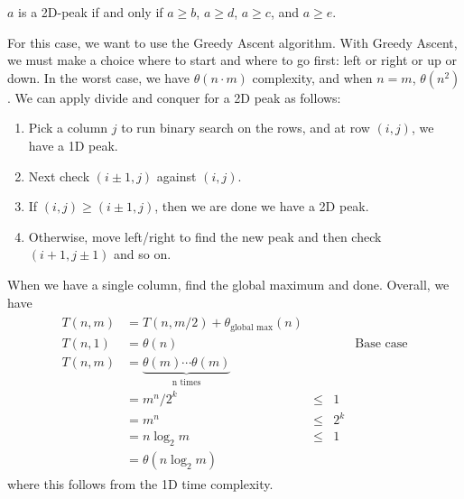 \begin{definition}
	\(a\) is a 2D-peak if and only if \(a\geq b\), \(a\geq d\), \(a\geq c\), and \(a\geq e\).
\end{definition}
\noindent
For this case, we want to use the Greedy Ascent algorithm. With Greedy Ascent, we must make a
choice where to start and where to go first: left or right or up or down. In the worst case, we have
\(\theta(n\cdot m)\) complexity, and when \(n = m\), \(\theta(n^2)\). We can apply divide and conquer
for a 2D peak as follows:
\begin{enumerate}
	\item Pick a column \(j\) to run binary search on the rows, and at row \((i, j)\), we have a 1D peak.
	\item Next check \((i \pm 1, j)\) against \((i, j)\).
	\item If \((i , j)\geq (i \pm 1, j)\), then we are done we have a 2D peak.
	\item Otherwise, move left/right to find the new peak and then check \((i + 1, j \pm 1)\) and so on.
\end{enumerate}
When we have a single column, find the global maximum and done. Overall, we have
\begin{align*}
	\begin{aligned}
		T(n ,m) & = T(n , m / 2) + \theta_{\text{global max}}(n)\\
		T(n , 1) & = \theta(n) & & & \text{Base case}\\
		T(n, m) & = \underbrace{\theta(m)\cdots\theta(m)}_{\text{n times}}\\
					& = m^n / 2^k & \leq & 1\\
					& = m^n & \leq & 2^k\\
					& = n\log_2 m & \leq & 1\\
					& = \theta(n\log_2 m)
	\end{aligned}
\end{align*}
where this follows from the 1D time complexity.